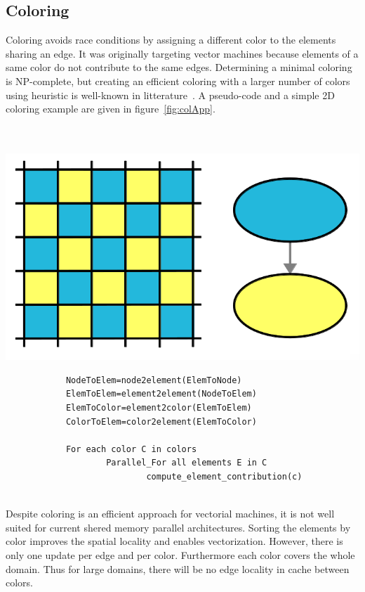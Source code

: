 \documentclass{IOS-Book-Article}
\begin{document}
\subsection{Coloring}
\label{sec:col}
Coloring avoids race conditions by assigning a different color to the elements sharing an edge.
It was originally targeting vector machines because elements of a same color do not contribute to the same edges.
Determining a minimal coloring is NP-complete, but creating an efficient coloring with a larger number of colors using heuristic is well-known in litterature~\cite{CPUfe}.
A pseudo-code and a simple 2D coloring example are given in figure~\ref{fig:colApp}.
~\\~\\~\\
{
\begin{minipage}[tp]{0.34\textwidth}
	\includegraphics[scale=0.15]{Coloring_approach.png}
\end{minipage}
\begin{minipage}[tp]{0.55\textwidth}
 		\small
 		\begin{verbatim}
			NodeToElem=node2element(ElemToNode)
			ElemToElem=element2element(NodeToElem)
			ElemToColor=element2color(ElemToElem)
			ColorToElem=color2element(ElemToColor)

			For each color C in colors
    				Parallel_For all elements E in C
        					compute_element_contribution(c)
 		\end{verbatim}
 \end{minipage}	
 }
 ~\\
Despite coloring is an efficient approach for vectorial machines, it is not well suited for current shered memory parallel architectures.
Sorting the elements by color improves the spatial locality and enables vectorization.
However, there is only one update per edge and per color. Furthermore each color covers the whole domain.
Thus for large domains, there will be no edge locality in cache between colors.
\end{document}
